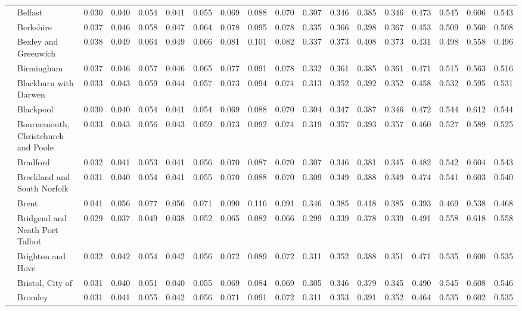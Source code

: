 \begin{tabular}{llrrrrrrrrrrrrrrrr}
 & Belfast & 0.030 & 0.040 & 0.054 & 0.041 & 0.055 & 0.069 & 0.088 & 0.070 & 0.307 & 0.346 & 0.385 & 0.346 & 0.473 & 0.545 & 0.606 & 0.543 \\
 & Berkshire & 0.037 & 0.046 & 0.058 & 0.047 & 0.064 & 0.078 & 0.095 & 0.078 & 0.335 & 0.366 & 0.398 & 0.367 & 0.453 & 0.509 & 0.560 & 0.508 \\
 & Bexley and Greenwich & 0.038 & 0.049 & 0.064 & 0.049 & 0.066 & 0.081 & 0.101 & 0.082 & 0.337 & 0.373 & 0.408 & 0.373 & 0.431 & 0.498 & 0.558 & 0.496 \\
 & Birmingham & 0.037 & 0.046 & 0.057 & 0.046 & 0.065 & 0.077 & 0.091 & 0.078 & 0.332 & 0.361 & 0.385 & 0.361 & 0.471 & 0.515 & 0.563 & 0.516 \\
 & Blackburn with Darwen & 0.033 & 0.043 & 0.059 & 0.044 & 0.057 & 0.073 & 0.094 & 0.074 & 0.313 & 0.352 & 0.392 & 0.352 & 0.458 & 0.532 & 0.595 & 0.531 \\
 & Blackpool & 0.030 & 0.040 & 0.054 & 0.041 & 0.054 & 0.069 & 0.088 & 0.070 & 0.304 & 0.347 & 0.387 & 0.346 & 0.472 & 0.544 & 0.612 & 0.544 \\
 & Bournemouth, Christchurch and Poole & 0.033 & 0.043 & 0.056 & 0.043 & 0.059 & 0.073 & 0.092 & 0.074 & 0.319 & 0.357 & 0.393 & 0.357 & 0.460 & 0.527 & 0.589 & 0.525 \\
 & Bradford & 0.032 & 0.041 & 0.053 & 0.041 & 0.056 & 0.070 & 0.087 & 0.070 & 0.307 & 0.346 & 0.381 & 0.345 & 0.482 & 0.542 & 0.604 & 0.543 \\
 & Breckland and South Norfolk & 0.031 & 0.040 & 0.054 & 0.041 & 0.055 & 0.070 & 0.088 & 0.070 & 0.309 & 0.349 & 0.388 & 0.349 & 0.474 & 0.541 & 0.603 & 0.540 \\
 & Brent & 0.041 & 0.056 & 0.077 & 0.056 & 0.071 & 0.090 & 0.116 & 0.091 & 0.346 & 0.385 & 0.418 & 0.385 & 0.393 & 0.469 & 0.538 & 0.468 \\
 & Bridgend and Neath Port Talbot & 0.029 & 0.037 & 0.049 & 0.038 & 0.052 & 0.065 & 0.082 & 0.066 & 0.299 & 0.339 & 0.378 & 0.339 & 0.491 & 0.558 & 0.618 & 0.558 \\
 & Brighton and Hove & 0.032 & 0.042 & 0.054 & 0.042 & 0.056 & 0.072 & 0.089 & 0.072 & 0.311 & 0.352 & 0.388 & 0.351 & 0.471 & 0.535 & 0.600 & 0.535 \\
 & Bristol, City of & 0.031 & 0.040 & 0.051 & 0.040 & 0.055 & 0.069 & 0.084 & 0.069 & 0.305 & 0.346 & 0.379 & 0.345 & 0.490 & 0.545 & 0.608 & 0.546 \\
 & Bromley & 0.031 & 0.041 & 0.055 & 0.042 & 0.056 & 0.071 & 0.091 & 0.072 & 0.311 & 0.353 & 0.391 & 0.352 & 0.464 & 0.535 & 0.602 & 0.535 \\

\end{tabular}
